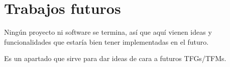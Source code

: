 \documentclass[a4paper, 12pt]{book}
\begin{document}
\section{Trabajos futuros}
\label{sec:trabajos_futuros}

Ningún proyecto ni software se termina, así que aquí vienen ideas y funcionalidades que estaría bien tener implementadas en el futuro.

Es un apartado que sirve para dar ideas de cara a futuros TFGs/TFMs.



\printglossary[type=\acronymtype]

\printglossary





\cleardoublepage

%
% 

\raggedright\printbibliography[heading=bibintoc,title={Referencias}]
\end{document}
